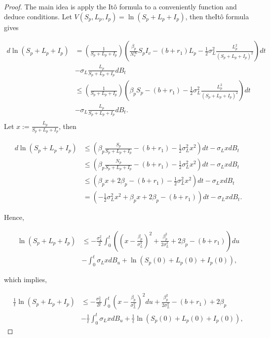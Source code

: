 \begin{proof}
	The main idea is apply the It\^{o} formula to a conveniently function and deduce conditions. Let $V(S_p,L_p,I_p)=\ln(S_p+L_p+I_p)$, then theIt\^{o} formula gives
	
		\begin{align*}
			d \ln(S_p+L_p+I_p) 
				&=
					\left(\frac{1}{S_p+L_p+I_p}\right)\left(\frac{\beta_p}{N_v^\infty} S_p I_v-(b+r_1)L_p-\frac{1}{2}\sigma_L^2\frac{L_p^2}{(S_p+L_p+I_p)^2}\right)dt\\
				&-
					\sigma_L \frac{L_p}{S_p+L_p+I_p}dB_t\\
				&\leq 
					\left(\frac{1}{S_p+L_p+I_p}\right)\left(\beta_p S_p-(b+r_1)-\frac{1}{2}\sigma_L^2\frac{L_p^2}{(S_p+L_p+I_p)^2}\right)dt\\
				&-
					\sigma_L \frac{L_p}{S_p+L_p+I_p}dB_t.\\
		\end{align*}
	Let $x:=\frac{L_p}{S_p+L_p+I_p}$, then
	
	\begin{align*}
		d \ln(S_p+L_p+I_p) 
			&\leq 
				\left(\beta_p\frac{S_p}{S_p+L_p+I_p}-(b+r_1)-\frac{1}{2}\sigma_L^2x^2\right)dt-\sigma_L xdB_t\\
			&\leq
				\left(\beta_p\frac{N_p}{S_p+L_p+I_p}-(b+r_1)-\frac{1}{2}\sigma_L^2x^2\right)dt-\sigma_L xdB_t\\
			&\leq
				\left(\beta_px+2\beta_p-(b+r_1)-\frac{1}{2}\sigma_L^2x^2\right)dt-\sigma_L xdB_t\\
			&=
				\left(-\frac{1}{2}\sigma_L^2x^2+\beta_px+2\beta_p-(b+r_1)\right)dt-\sigma_L xdB_t.			
	\end{align*}
	
	Hence,
	
	\begin{align*}
		\ln(S_p+L_p+I_p)
			&\leq
				-\frac{\sigma_L^2}{2}\int_{0}^{t}\left(\left(x-\frac{\beta_p}{\sigma_L^2}\right)^2 +\frac{\beta_p^2}{2\sigma_L^2}+2\beta_p-(b+r_1)\right)du\\
			&-
				\int_{0}^{t}\sigma_L xdB_u+\ln(S_p(0)+L_p(0)+I_p(0)),
	\end{align*}
	
	which implies,
	
		\begin{align}\label{eq4.1}
			\frac{1}{t}\ln(S_p+L_p+I_p) 
				&\leq
					-\frac{\sigma_L^2}{2t}\int_{0}^{t}\left(x-\frac{\beta_p}{\sigma_L^2}\right)^2du+
					\frac{\beta_p^2}{2\sigma_L^2}-(b+r_1)+2\beta_p\nonumber\\
				&-
					\frac{1}{t}\int_{0}^{t}\sigma_L xdB_u+\frac{1}{t}\ln(S_p(0)+L_p(0)+I_p(0)),
		\end{align}
	

\end{proof}
